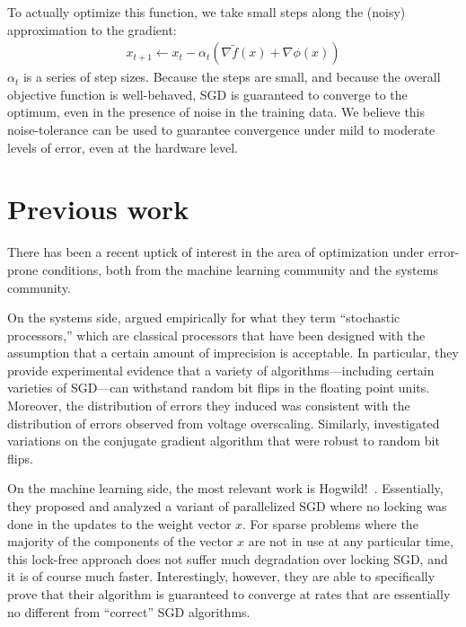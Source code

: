 \documentclass[12pt,leqno,twoside]{article}
\begin{document}
To actually optimize this function, we take small steps along the (noisy)
approximation to the gradient:
\begin{equation}
  \begin{split}
    x_{t+1} \gets x_t - \alpha_t \left ( \nabla \tilde f(x) + \nabla \phi(x)\right )
   \end{split}
 \end{equation}
$\alpha_t$ is a series of step sizes. Because the
steps are small, and because the overall objective function is
well-behaved, SGD is guaranteed to converge to the optimum, even
in the presence of noise in the training data. We believe this
noise-tolerance can be used to guarantee convergence under mild to
moderate levels of error, even at the hardware level.

\section{Previous work}

There has been a recent uptick of interest in the area of optimization
under error-prone conditions, both from the machine learning community
and the systems community. 

On the systems side, \citet{sartori11stochastic} argued empirically
for what they term ``stochastic processors,'' which are classical
processors that have been designed with the assumption that a certain
amount of imprecision is acceptable. In particular, they provide
experimental evidence that a variety of algorithms---including
certain varieties of SGD---can withstand random bit flips in the
floating point units. Moreover, the distribution of errors they
induced was consistent with the distribution of errors observed
from voltage overscaling. Similarly, \citet{oberil11numerical}
investigated variations on the conjugate gradient algorithm that
were robust to random bit flips.

On the machine learning side, the most relevant work is
Hogwild!~\citep{niu11hogwild}. Essentially, they proposed and
analyzed a variant of parallelized SGD where no locking was done
in the updates to the weight vector $x$. For sparse problems where
the majority of the components of the vector $x$ are not in use at
any particular time, this lock-free approach does not suffer much
degradation over locking SGD, and it is of course much faster.
Interestingly, however, they are able to specifically prove that
their algorithm is guaranteed to converge at rates that are essentially
no different from ``correct'' SGD algorithms.
\end{document}
